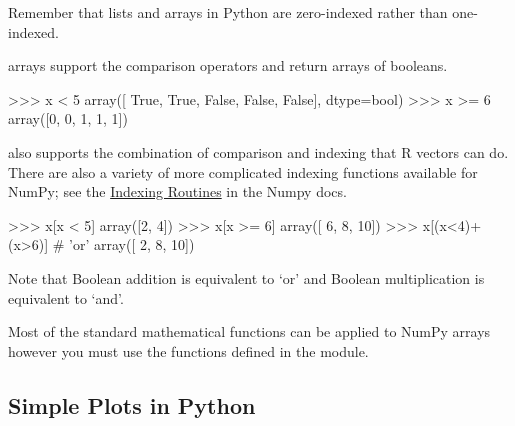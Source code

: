 Remember that lists and arrays in Python are zero-indexed rather than
one-indexed.
%

\numpy arrays support the comparison operators and return arrays of
booleans.
\begin{python}
    >>> x < 5 
    array([ True, True, False, False, False], dtype=bool)
    >>> x >= 6 
    array([0, 0, 1, 1, 1])
\end{python}
%
\numpy also supports the combination of comparison and indexing that R vectors
can do. There are also a variety of more complicated indexing functions
available for NumPy; see the
\href{http://docs.scipy.org/doc/numpy/reference/routines.indexing.html}{Indexing Routines} in the Numpy docs.
%
\begin{python}
>>> x[x < 5]
array([2, 4])
>>> x[x >= 6]
array([ 6,  8, 10])
>>> x[(x<4)+(x>6)]  # 'or'
array([ 2,  8, 10])
\end{python}
%
Note that Boolean addition is equivalent to `or' and Boolean
multiplication is equivalent to `and'.

Most of the standard mathematical functions can be applied to NumPy
arrays however you must use the functions defined in the
\numpy module.
%


\subsection{Simple Plots in Python}

